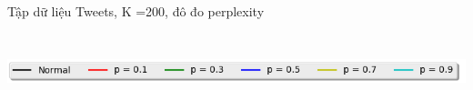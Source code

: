 \documentclass[pdf]{beamer}
\begin{document}
\begin{frame}{Tập dữ liệu Tweets, K =200, đô đo perplexity}
\begin{columns}[T] %
\begin{column}{.50\textwidth}
\begin{figure}
\end{figure}
\end{column} %
\hfill%
\begin{column}{.50\textwidth}
\begin{figure}
\end{figure}				
\end{column} %
\end{columns}
\begin{center}
\includegraphics[width=1\textwidth]{menu.png}	
\end{center}
\end{frame}
\end{document}
